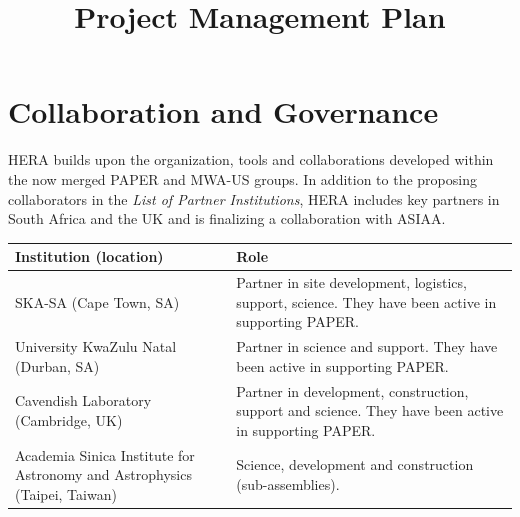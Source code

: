 \documentclass[preprint]{aastex}
\begin{document}
\title{Project Management Plan}


\section{Collaboration and Governance}
HERA builds upon the organization, tools and collaborations developed within the now merged 
PAPER and MWA-US groups.
In addition to the proposing collaborators in the {\em List of Partner Institutions},
HERA includes key partners in South Africa and the UK and is finalizing a collaboration with ASIAA.
\begin{table}[h]
\begin{tabular}{| p{} | p{} |}\hline
\textbf{Institution (location)} & \textbf{Role} \\ \hline
SKA-SA (Cape Town, SA) & Partner in site development, logistics, support, science. They have been active in supporting PAPER.\\ \hline
University KwaZulu Natal (Durban, SA) & Partner in science and support. They have been active in supporting PAPER.\\ \hline
Cavendish Laboratory (Cambridge, UK) & Partner in development, construction, support and science.  They have been active in supporting PAPER. \\ \hline
Academia Sinica Institute for Astronomy and Astrophysics (Taipei, Taiwan) & Science, development and construction (sub-assemblies). \\ \hline
\end{tabular}
\label{tab:otherpartners}
\end{table}
\end{document}
